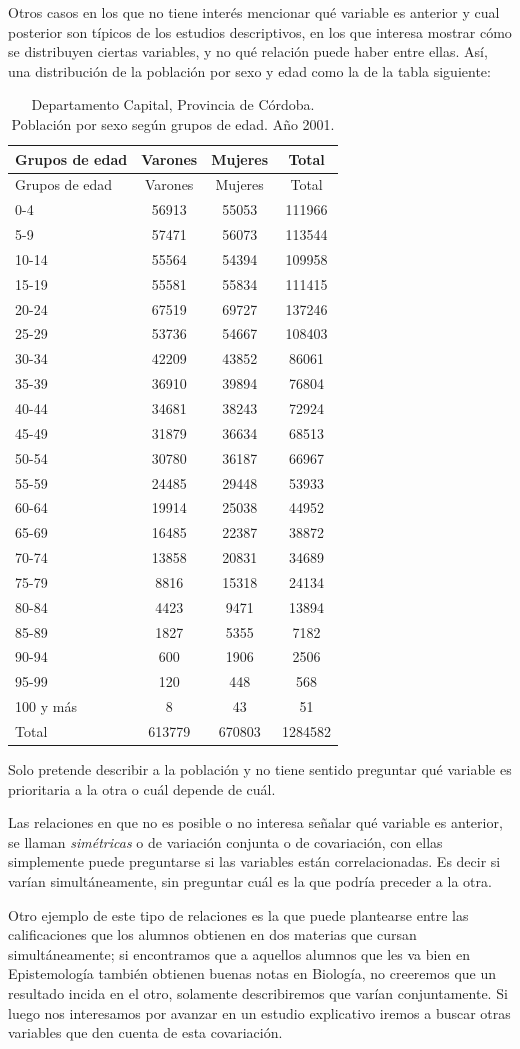 \documentclass[]{book}
\begin{document}
Otros casos en los que no tiene interés mencionar qué variable es
anterior y cual posterior son típicos de los estudios descriptivos, en
los que interesa mostrar cómo se distribuyen ciertas variables, y no qué
relación puede haber entre ellas. Así, una distribución de la población por sexo y edad como la de la tabla siguiente:

\begin{longtable}[]{@{}lccc@{}}
\caption{\label{tab:unnamed-chunk-105}Departamento Capital, Provincia de Córdoba. Población por sexo según grupos de edad. Año 2001.}\tabularnewline
\toprule
Grupos de edad & Varones & Mujeres & Total\tabularnewline
\midrule
\endfirsthead
\toprule
Grupos de edad & Varones & Mujeres & Total\tabularnewline
\midrule
\endhead
0-4 & 56913 & 55053 & 111966\tabularnewline
5-9 & 57471 & 56073 & 113544\tabularnewline
10-14 & 55564 & 54394 & 109958\tabularnewline
15-19 & 55581 & 55834 & 111415\tabularnewline
20-24 & 67519 & 69727 & 137246\tabularnewline
25-29 & 53736 & 54667 & 108403\tabularnewline
30-34 & 42209 & 43852 & 86061\tabularnewline
35-39 & 36910 & 39894 & 76804\tabularnewline
40-44 & 34681 & 38243 & 72924\tabularnewline
45-49 & 31879 & 36634 & 68513\tabularnewline
50-54 & 30780 & 36187 & 66967\tabularnewline
55-59 & 24485 & 29448 & 53933\tabularnewline
60-64 & 19914 & 25038 & 44952\tabularnewline
65-69 & 16485 & 22387 & 38872\tabularnewline
70-74 & 13858 & 20831 & 34689\tabularnewline
75-79 & 8816 & 15318 & 24134\tabularnewline
80-84 & 4423 & 9471 & 13894\tabularnewline
85-89 & 1827 & 5355 & 7182\tabularnewline
90-94 & 600 & 1906 & 2506\tabularnewline
95-99 & 120 & 448 & 568\tabularnewline
100 y más & 8 & 43 & 51\tabularnewline
Total & 613779 & 670803 & 1284582\tabularnewline
\bottomrule
\end{longtable}

Solo pretende describir a la población y no tiene sentido preguntar qué variable es prioritaria a la otra o cuál depende de cuál.

Las relaciones en que no es posible o no interesa señalar qué variable
es anterior, se llaman \emph{simétricas} o de variación conjunta o de
covariación, con ellas simplemente puede preguntarse si las variables
están correlacionadas. Es decir si varían simultáneamente, sin
preguntar cuál es la que podría preceder a la otra.

Otro ejemplo de este tipo de relaciones es la que puede plantearse entre las calificaciones que los alumnos obtienen en dos materias que cursan simultáneamente; si encontramos que a aquellos alumnos que les va bien en Epistemología también obtienen buenas notas en Biología, no creeremos que un resultado incida en el otro, solamente describiremos que varían conjuntamente. Si luego nos interesamos por avanzar en un estudio explicativo iremos a buscar otras variables que den cuenta de esta covariación.
\end{document}
